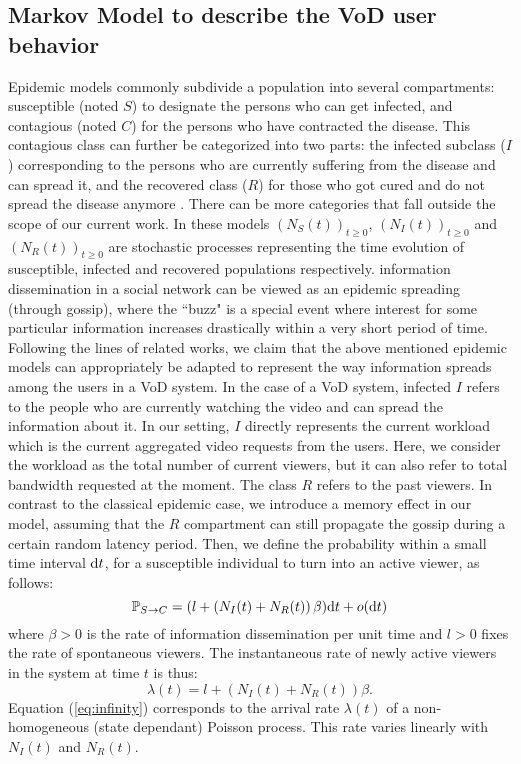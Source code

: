 \documentclass[twoside]{article}
\begin{document}
\subsection{Markov Model to describe the VoD user behavior}
\label{sec:markov}
{Epidemic models commonly subdivide a population into several compartments:} susceptible (noted $S$) to designate the persons who can get infected, and contagious (noted $C$) for the persons who have contracted the disease. This contagious class can further be categorized into two parts: the infected subclass ($I$) corresponding to the persons who are currently suffering from the disease and can spread it, and the recovered class ($R$) for those who got cured and do not spread the disease anymore \cite{BarDynaPro2008}. There can be more categories {that fall outside} the scope  of our current work.  In these models $(N_{S}(t))_{t \geq 0}$, $(N_{I}(t))_{t \geq 0}$ and $(N_{R}(t))_{t \geq 0}$ are stochastic processes representing the {time} evolution of susceptible, infected and recovered populations respectively.
 information dissemination in a social {network} can be viewed as an epidemic spreading {(through gossip)}, where the ``buzz"  is a special event where interest {for} some {particular} information increases {drastically} within a very short period {of time}. Following {the lines of} related works, we claim that the above mentioned epidemic models can appropriately be adapted to represent the way information spreads among the users in a VoD system.  In the case of a VoD system, infected $I$ refers to the people who  are currently watching the video and can spread the information about it. {In our setting,} $I$ directly represents the current workload which is the current aggregated video requests from the users. Here, we consider the workload as the total number of current viewers, but it can also refer to total bandwidth requested at the moment. The class $R$  refers to the past viewers. {In contrast to the classical epidemic case, we introduce a memory effect in our model, assuming that the $R$ compartment can still propagate the gossip during a certain random latency period.}
{Then, we define the probability within a small time interval ${\rm d}t$, for a susceptible individual to turn into an active viewer, as follows}:
\begin{equation}
\mathbb{P}_{S\to C} = {(l+ (N_I(t)+N_R(t)) \, \beta) {\rm d}t} + o({\rm d}t)
\label{eq:transition-prob}
\end{equation}
where $\beta > 0$ is the rate of information dissemination per unit time and $l>0$ fixes the rate of spontaneous viewers.
The  instantaneous rate of newly active viewers in the system at time $t$ is thus:
\begin{equation}
\lambda(t) = l+ (N_I(t)+N_R(t))\beta.
\label{eq:infinity}
\end{equation}
Equation (\ref{eq:infinity}) corresponds to the arrival rate $\lambda(t)$ of a non-homogeneous (state dependant) Poisson process. This rate varies linearly with $N_I(t)$ and $N_R(t)$.
\end{document}

